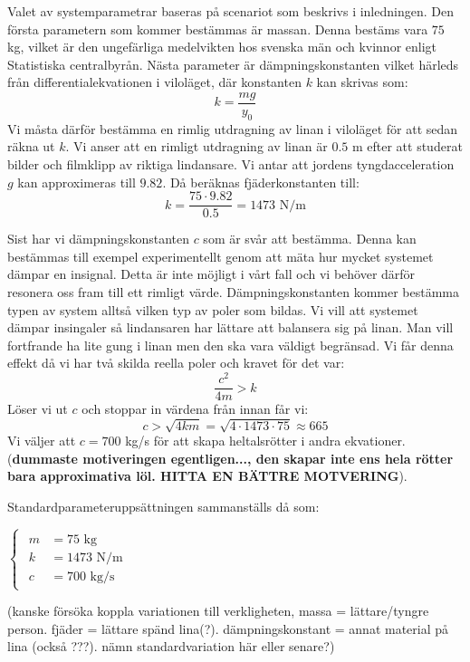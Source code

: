 Valet av systemparametrar baseras på scenariot som beskrivs i inledningen. Den första parametern som kommer bestämmas är massan. Denna bestäms vara $75$ kg,  vilket är den ungefärliga medelvikten hos svenska män och kvinnor enligt Statistiska centralbyrån.
Nästa parameter är dämpningskonstanten vilket härleds från differentialekvationen i viloläget, där konstanten $k$ kan skrivas som:
\newline$$k=\frac{mg}{y_0}$$\newline
Vi måsta därför bestämma en rimlig utdragning av linan i viloläget för att sedan räkna ut $k$. Vi anser att en rimligt utdragning av linan är $0.5$ m efter att studerat bilder och filmklipp av riktiga lindansare. Vi antar att jordens tyngdacceleration $g$ kan approximeras till $9.82$. Då beräknas fjäderkonstanten till:
\newline$$k=\frac{75 \cdot 9.82}{0.5}=1473 \text{ N/m}$$

Sist har vi dämpningskonstanten $c$ som är svår att bestämma. Denna kan bestämmas till exempel experimentellt genom att mäta hur mycket systemet dämpar en insignal. Detta är inte möjligt i vårt fall och vi behöver därför resonera oss fram till ett rimligt värde. Dämpningskonstanten kommer bestämma typen av system alltså vilken typ av poler som bildas. Vi vill att systemet dämpar insingaler så lindansaren har lättare att balansera sig på linan. Man vill fortfrande ha lite gung i linan men den ska vara väldigt begränsad. Vi får denna effekt då vi har två skilda reella poler och kravet för det var:
$$\frac{c^2}{4m} > k $$
Löser vi ut $c$ och stoppar in värdena från innan får vi:
$$c>\sqrt{4km}=\sqrt{4\cdot 1473\cdot 75} \approx 665$$
Vi väljer att $c=700$ kg/s för att skapa heltalsrötter i andra ekvationer. (\textbf{dummaste motiveringen egentligen..., den skapar inte ens hela rötter bara approximativa löl. HITTA EN BÄTTRE MOTVERING}).

Standardparameteruppsättningen sammanställs då som:

$\begin{cases}
\begin{aligned}
m&=75 \text{ kg} \\
k&=1473 \text{ N/m} \\
c&=700 \text{ kg/s}
\end{aligned}
\end{cases}$

(kanske försöka koppla variationen till verkligheten, massa = lättare/tyngre person. fjäder = lättare spänd lina(?). dämpningskonstant = annat material på lina (också ???).
nämn standardvariation här eller senare?)

